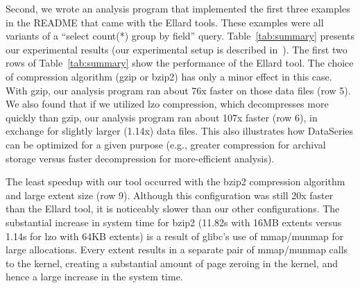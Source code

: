 \documentclass{acm_proc_article-sp}
\begin{document}
Second, we
wrote an analysis program that implemented the first three examples in
the README that came with the Ellard tools.  
These examples were
all variants of a ``select count(*) group by field'' query.
Table~\ref{tab:summary} presents our experimental results
(our experimental setup 
is described in~\cite{DSTechnicalReportSnapshot}).
The first two rows of Table~\ref{tab:summary} show the performance
of the Ellard tool.  The choice of compression algorithm (gzip or bzip2)
has only a minor effect in this case.
With gzip, our analysis program ran about 76x faster on those data files 
(row 5).
We also found that
if we utilized lzo compression, which decompresses more quickly than
gzip, our analysis program ran about 107x faster (row 6), in exchange for
slightly larger (1.14x) data files.  This also illustrates how
DataSeries can be optimized for a given purpose (e.g., greater
compression for archival storage versus faster decompression for 
more-efficient analysis). 

The least speedup with our tool occurred with the bzip2 compression
algorithm and large extent size (row 9).
Although this configuration was still 20x faster than the Ellard tool,
it is noticeably slower than our other configurations.  The substantial
increase in system time for bzip2 (11.82s with 16MB extents versus
1.14s for lzo with 64KB extents) is a result of glibc's use of
mmap/munmap
for large allocations.  Every extent results in a separate pair of
mmap/munmap calls to the kernel, creating a substantial amount of page
zeroing in the kernel, and hence a large increase in the system time. 



\end{document}
